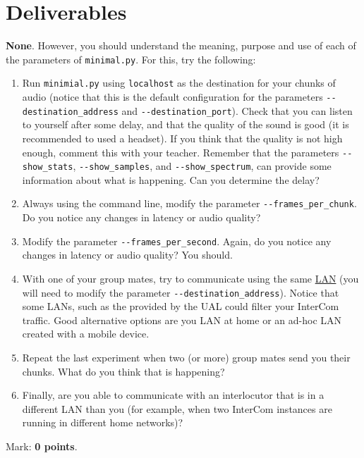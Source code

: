 \section{Deliverables}

\textbf{None}. However, you should understand the meaning, purpose and
use of each of the parameters of \texttt{minimal.py}. For this, try
the following:

\begin{enumerate}
\item Run \texttt{minimial.py} using \texttt{localhost} as the
  destination for your chunks of audio (notice that this is the
  default configuration for the parameters
  \verb|--destination_address| and \verb|--destination_port|). Check
  that you can listen to yourself after some delay, and that the
  quality of the sound is good (it is recommended to used a
  headset). If you think that the quality is not high enough, comment
  this with your teacher. Remember that the parameters
  \verb|--show_stats|, \verb|--show_samples|, and
  \verb|--show_spectrum|, can provide some information about what is
  happening. Can you determine the delay?
\item Always using the command line, modify the parameter
  \verb|--frames_per_chunk|. Do you notice any changes in latency
  or audio quality?
\item Modify the parameter \verb|--frames_per_second|. Again, do
  you notice any changes in latency or audio quality? You should.
\item With one of your group mates, try to communicate using the same
  \href{https://en.wikipedia.org/wiki/Local_area_network}{LAN} (you
  will need to modify the parameter
  \verb|--destination_address|). Notice that some LANs, such as the
  provided by the UAL could filter your InterCom traffic. Good
  alternative options are you LAN at home or an ad-hoc LAN created
  with a mobile device.
\item Repeat the last experiment when two (or more) group mates send
  you their chunks. What do you think that is happening?
\item Finally, are you able to communicate with an interlocutor that
  is in a different LAN than you (for example, when two InterCom
  instances are running in different home networks)?
\end{enumerate}

Mark: \textbf{0 points}.

